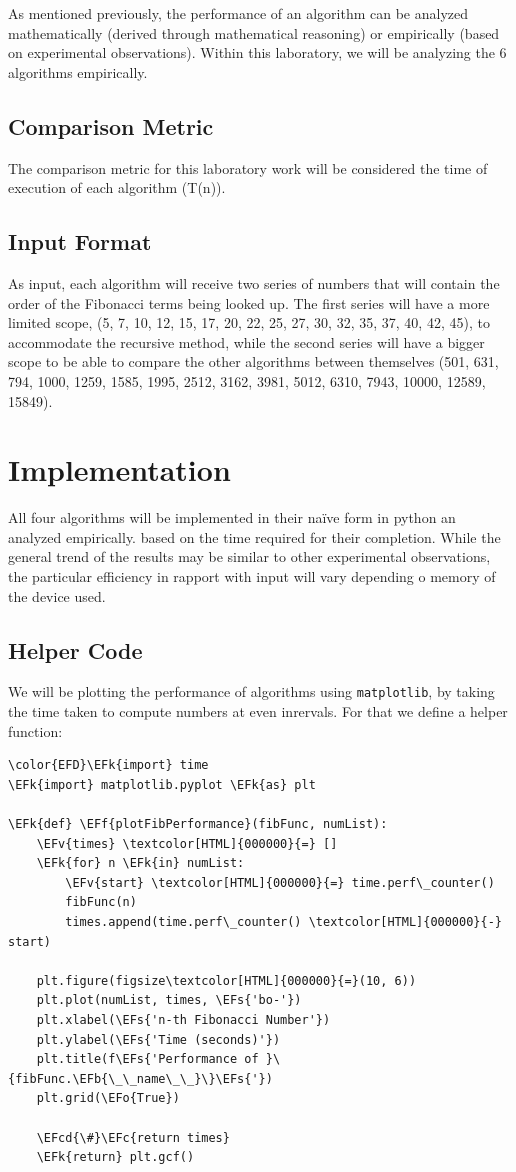 \documentclass[a4paper,12pt]{article}
\newcommand{\EFc}[1]{\textcolor{EFc}{#1}} %
\newcommand{\EFcd}[1]{\textcolor{EFcd}{#1}} %
\newcommand{\EFs}[1]{\textcolor{EFs}{#1}} %
\newcommand{\EFk}[1]{\textcolor{EFk}{#1}} %
\newcommand{\EFb}[1]{\textcolor{EFb}{#1}} %
\newcommand{\EFf}[1]{\textcolor{EFf}{#1}} %
\newcommand{\EFv}[1]{\textcolor{EFv}{#1}} %
\newcommand{\EFo}[1]{\textcolor{EFo}{#1}} %
\begin{document}
As mentioned previously, the performance of an algorithm can be analyzed mathematically
(derived through mathematical reasoning) or empirically (based on experimental observations).
Within this laboratory, we will be analyzing the 6 algorithms empirically.
\subsection{Comparison Metric}
\label{sec:org69341c8}
The comparison metric for this laboratory work will be considered the time of execution of each algorithm (T(n)).
\subsection{Input Format}
\label{sec:orgc4c5d8d}
As input, each algorithm will receive two series of numbers that will contain the order of the
Fibonacci terms being looked up. The first series will have a more limited scope, (5, 7, 10, 12, 15, 17, 20,
22, 25, 27, 30, 32, 35, 37, 40, 42, 45), to accommodate the recursive method, while the second series will
have a bigger scope to be able to compare the other algorithms between themselves (501, 631, 794, 1000,
1259, 1585, 1995, 2512, 3162, 3981, 5012, 6310, 7943, 10000, 12589, 15849).
\section{Implementation}
\label{sec:orgc6b129c}
All four algorithms will be implemented in their naïve form in python an analyzed empirically.
based on the time required for their completion. While the general trend of the results may be similar to
other experimental observations, the particular efficiency in rapport with input will vary depending o
memory of the device used.
\subsection{Helper Code}
\label{sec:orgd8f8d7c}
We will be plotting the performance of algorithms using \texttt{matplotlib}, by taking the time taken to compute numbers at even inrervals. For that we define a helper function:
\begin{Code}
\begin{Verbatim}
\color{EFD}\EFk{import} time
\EFk{import} matplotlib.pyplot \EFk{as} plt

\EFk{def} \EFf{plotFibPerformance}(fibFunc, numList):
    \EFv{times} \textcolor[HTML]{000000}{=} []
    \EFk{for} n \EFk{in} numList:
        \EFv{start} \textcolor[HTML]{000000}{=} time.perf\_counter()
        fibFunc(n)
        times.append(time.perf\_counter() \textcolor[HTML]{000000}{-} start)

    plt.figure(figsize\textcolor[HTML]{000000}{=}(10, 6))
    plt.plot(numList, times, \EFs{'bo-'})
    plt.xlabel(\EFs{'n-th Fibonacci Number'})
    plt.ylabel(\EFs{'Time (seconds)'})
    plt.title(f\EFs{'Performance of }\{fibFunc.\EFb{\_\_name\_\_}\}\EFs{'})
    plt.grid(\EFo{True})

    \EFcd{\#}\EFc{return times}
    \EFk{return} plt.gcf()
\end{Verbatim}
\end{Code}
\end{document}
